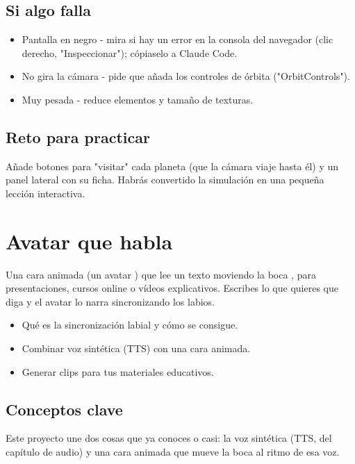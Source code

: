 \documentclass[11pt,a4paper]{book}
\begin{document}
\section{Si algo falla}
\begin{itemize}\item Pantalla en negro - mira si hay un error en la consola del navegador (clic derecho, "Inspeccionar"); cópiaselo a Claude Code.\end{itemize}
\begin{itemize}\item No gira la cámara - pide que añada los controles de órbita ("OrbitControls").\end{itemize}
\begin{itemize}\item Muy pesada - reduce elementos y tamaño de texturas.\end{itemize}
\section{Reto para practicar}
Añade botones para "visitar" cada planeta (que la cámara viaje hasta él) y un panel lateral con su ficha. Habrás convertido la simulación en una pequeña lección interactiva.

\chapter{Avatar que habla}
Una cara animada (un avatar ) que lee un texto moviendo la boca , para presentaciones, cursos online o vídeos explicativos. Escribes lo que quieres que diga y el avatar lo narra sincronizando los labios.

\begin{itemize}\item Qué es la sincronización labial y cómo se consigue.\end{itemize}
\begin{itemize}\item Combinar voz sintética (TTS) con una cara animada.\end{itemize}
\begin{itemize}\item Generar clips para tus materiales educativos.\end{itemize}
\section{Conceptos clave}
Este proyecto une dos cosas que ya conoces o casi: la voz sintética (TTS, del capítulo de audio) y una cara animada que mueve la boca al ritmo de esa voz.
\end{document}
